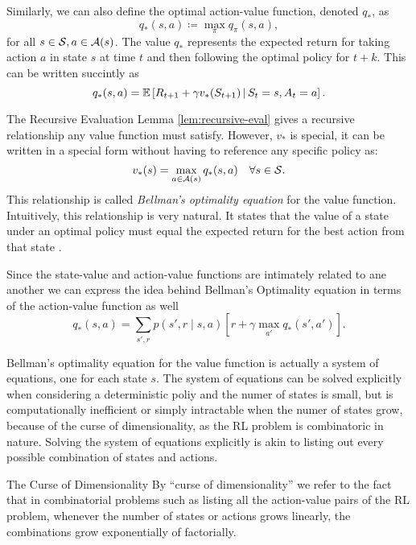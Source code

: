 Similarly, we can also define the optimal action-value function, denoted $q_*$, as
\begin{equation*}
	q_* (s, a) \coloneqq \max_{\pi} q_\pi (s, a),
\end{equation*}
for all $s \in \mathcal{S}, a \in \mathcal{A}(s)$. The value $q_*$ represents the expected return for taking action $a$ in state $s$ at time $t$ and then following the optimal policy for $t+k$. This can be written succintly as
\begin{equation*}
	q_{*} (s, a) = \mathbb{E} \left[ R_{t+1} + \gamma v_* (S_{t+1}) \,\middle\vert\, S_t = s, A_t = a \right].
\end{equation*}

The Recursive Evaluation Lemma \ref{lem:recursive-eval} gives a recursive
relationship any value function must satisfy. However, $v_*$ is special, it can
be written in a special form \cite{bellman1957,SuttonBarto,raoRL4F} without
having to reference any specific policy as:
\begin{equation}
	\label{eq:prop-dependencia-vq}
	v_* (s) = \max_{a \in \mathcal{A}(s)} q_* (s, a) \quad \forall s \in \mathcal{S}.
\end{equation}
This relationship is called \textit{Bellman's optimality equation} for the value
function. Intuitively, this relationship is very natural. It states that the
value of a state under an optimal policy must equal the expected return for the
best action from that state \cite[Ch.~3.6]{SuttonBarto}.

Since the state-value and action-value functions are intimately related to ane
another we can express the idea behind Bellman's Optimality equation in terms of
the action-value function as well
\begin{equation*}
	q_* (s, a) = \sum_{s', r} p(s', r \mid s, a) \left[ r + \gamma \max_{a'} q_{*} (s', a') \right].
\end{equation*}

Bellman's optimality equation for the value function is actually a system of
equations, one for each state $s$. The system of equations can be solved
explicitly when considering a deterministic poliy and the numer of states is
small, but is computationally inefficient or simply intractable when the numer
of states grow, because of the curse of dimensionality, as the RL problem is
combinatoric in nature. Solving the system of equations explicitly is akin to
listing out every possible combination of states and actions.

\begin{remark}{The Curse of Dimensionality}
	By ``curse of dimensionality'' we refer to the fact that in combinatorial
	problems such as listing all the action-value pairs of the RL problem,
	whenever the number of states or actions grows linearly, the combinations
	grow exponentially of factorially.
\end{remark}

